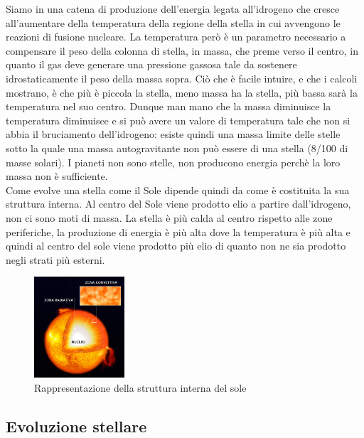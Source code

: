 \documentclass[a4paper,11pt]{article}
\begin{document}
    Siamo in una catena di produzione dell'energia legata all'idrogeno che cresce all'aumentare della temperatura della regione della stella in cui avvengono le reazioni di fusione nucleare. La temperatura però è un parametro necessario a compensare il peso della colonna di stella, in massa, che preme verso il centro, in quanto il gas deve generare una pressione gassosa tale da sostenere idrostaticamente il peso della massa sopra. Ciò che è facile intuire, e che i calcoli mostrano, è che più è piccola la stella, meno massa ha la stella, più bassa sarà la temperatura nel suo centro. Dunque man mano che la massa diminuisce la temperatura diminuisce e si può avere un valore di temperatura tale che non si abbia il bruciamento dell'idrogeno: esiste quindi una massa limite delle stelle sotto la quale una massa autogravitante non può essere di una stella (8/100 di masse solari). I pianeti non sono stelle, non producono energia perchè la loro massa non è sufficiente.\\ 
    Come evolve una stella come il Sole dipende quindi da come è costituita la sua struttura interna. Al centro del Sole viene prodotto elio a partire dall'idrogeno, non ci sono moti di massa. La stella è più calda al centro rispetto alle zone periferiche, la produzione di energia è più alta dove la temperatura è più alta e quindi al centro del sole viene prodotto più elio di quanto non ne sia prodotto negli strati più esterni. 

    \begin{figure}[h!!]
        \centering
        \includegraphics[width=0.3\textwidth]{Sole.jpeg}
        \caption{Rappresentazione della struttura interna del sole}
        \label{fig:Sole.jpeg}
    \end{figure}
    
\newpage
    \subsection{Evoluzione stellare}
\end{document}
